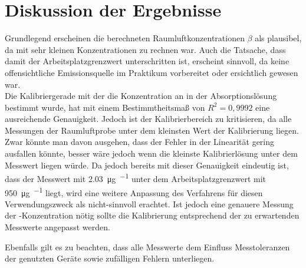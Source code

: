 \section{Diskussion der Ergebnisse}
\label{sec:diskussion}
Grundlegend erscheinen die berechneten Raumluftkonzentrationen $\beta$ als plausibel, da mit sehr kleinen Konzentrationen zu rechnen war. Auch die Tatsache, dass damit der Arbeitsplatzgrenzwert unterschritten ist, erscheint sinnvoll, da keine offensichtliche Emissionsquelle im Praktikum vorbereitet oder ersichtlich gewesen war.\\
Die Kalibriergerade mit der die Konzentration an  in der Absorptionslösung bestimmt wurde, hat mit einem Bestimmtheitsmaß von $R^2=0,9992$ eine ausreichende Genauigkeit. Jedoch ist der Kalibrierbereich zu kritisieren, da alle Messungen der Raumluftprobe unter dem kleinsten Wert der Kalibrierung liegen. Zwar könnte man davon ausgehen, dass der Fehler in der Linearität gering ausfallen könnte, besser wäre jedoch wenn die kleinste Kalibrierlösung unter dem Messwert liegen würde. 
Da jedoch bereits mit dieser Genauigkeit eindeutig ist, dass der Messwert mit \SI{2,03}{\micro\gram \per \kmeter} unter dem Arbeitsplatzgrenzwert mit \SI{950}{\micro\gram \per \kmeter} liegt, wird eine weitere Anpassung des Verfahrens für diesen Verwendungszweck als nicht-sinnvoll erachtet. Ist jedoch eine genauere Messung der -Konzentration nötig sollte die Kalibrierung entsprechend der zu erwartenden Messwerte angepasst werden.

Ebenfalls gilt es zu beachten, dass alle Messwerte dem Einfluss Messtoleranzen der genutzten Geräte sowie zufälligen Fehlern unterliegen.
